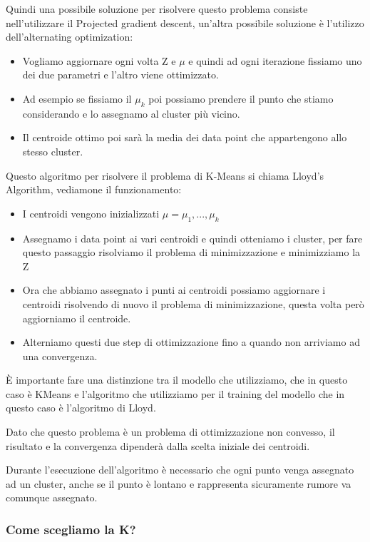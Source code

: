 \documentclass[14pt]{extreport}
\begin{document}
Quindi una possibile soluzione per risolvere questo problema consiste nell'utilizzare il Projected gradient descent, un'altra possibile soluzione è
l'utilizzo dell'alternating optimization:
\begin{itemize}
	\item Vogliamo aggiornare ogni volta Z e $\mu$ e quindi ad ogni iterazione fissiamo uno dei due parametri e l'altro viene ottimizzato.
	\item Ad esempio se fissiamo il $\mu_k$ poi possiamo prendere il punto che stiamo considerando e lo assegnamo al cluster più vicino.
	\item Il centroide ottimo poi sarà la media dei data point che appartengono allo stesso cluster.
\end{itemize}

Questo algoritmo per risolvere il problema di K-Means si chiama Lloyd's Algorithm, vediamone il funzionamento:
\begin{itemize}
	\item I centroidi vengono inizializzati $\mu = {\mu_1,..., \mu_k}$
	\item Assegnamo i data point ai vari centroidi e quindi otteniamo i cluster, per fare questo passaggio risolviamo il problema di minimizzazione e
	minimizziamo la Z
	\item Ora che abbiamo assegnato i punti ai centroidi possiamo aggiornare i centroidi risolvendo di nuovo il problema di minimizzazione, questa
	volta però aggiorniamo il centroide.
	\item Alterniamo questi due step di ottimizzazione fino a quando non arriviamo ad una convergenza.
\end{itemize}

È importante fare una distinzione tra il modello che utilizziamo, che in questo caso è KMeans e l'algoritmo che utilizziamo per il training del
modello che in questo caso è l'algoritmo di Lloyd.

Dato che questo problema è un problema di ottimizzazione non convesso, il risultato e la convergenza dipenderà dalla scelta iniziale dei centroidi.

Durante l'esecuzione dell'algoritmo è necessario che ogni punto venga assegnato ad un cluster, anche se il punto è lontano e rappresenta sicuramente
rumore va comunque assegnato.

\subsubsection{Come scegliamo la K?}
\end{document}
